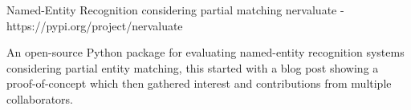 \begin{cventries}
 \cventry
   {Named-Entity Recognition considering partial matching} %
   {nervaluate - https://pypi.org/project/nervaluate} %
   {} %
   {} %
   {
     \begin{cvitems} %
     	\item {An open-source Python package for evaluating named-entity recognition systems considering partial entity matching, this started with a blog post showing a proof-of-concept which then gathered interest and contributions from multiple collaborators.}
     \end{cvitems}
   }
\end{cventries}


